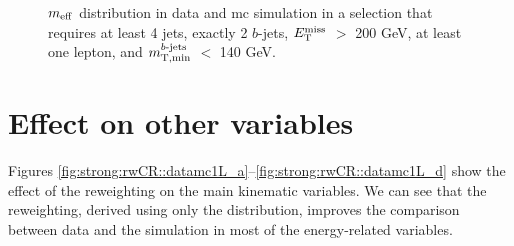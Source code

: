 \begin{figure}[htbp]
\centering
{}
\caption{$m_{\mathrm{eff}}$ distribution in data and \gls{mc} simulation in a selection that requires at least 4 jets, exactly 2 $b$-jets, $E_{\rm T}^{\mathrm{miss}}$ $>$ 200 GeV,
at least one lepton, and $m_{\mathrm{T, min}}^{b\textrm{-jets}}$ $<$ 140 GeV.}
\label{fig:meff_in2b_no_corr}
\end{figure}



\section{Effect on other variables}

Figures \ref{fig:strong:rwCR::datamc1L_a}--\ref{fig:strong:rwCR::datamc1L_d}
show the effect of the reweighting on the main kinematic variables.
We can see that the reweighting, derived using only the \meff distribution, improves the 
comparison between data and the simulation 
in most of the energy-related variables.

